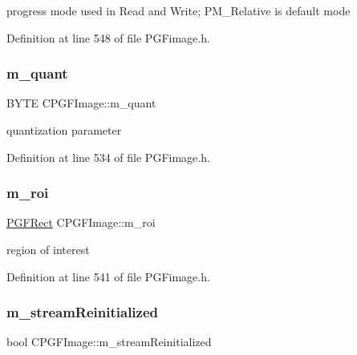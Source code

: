 progress mode used in Read and Write; P\+M\+\_\+\+Relative is default mode 



Definition at line 548 of file P\+G\+Fimage.\+h.

\mbox{\label{classCPGFImage_a57cc024db6e510f95f3238f448a0fed5}} 
\subsubsection{\texorpdfstring{m\_quant}{m\_quant}}
{\footnotesize\ttfamily B\+Y\+TE C\+P\+G\+F\+Image\+::m\+\_\+quant\hspace{0.3cm}{\ttfamily [protected]}}



quantization parameter 



Definition at line 534 of file P\+G\+Fimage.\+h.

\mbox{\label{classCPGFImage_a79627ae9b19c69589eaa2ba7711ddd00}} 
\subsubsection{\texorpdfstring{m\_roi}{m\_roi}}
{\footnotesize\ttfamily \mbox{\hyperlink{structPGFRect}{P\+G\+F\+Rect}} C\+P\+G\+F\+Image\+::m\+\_\+roi\hspace{0.3cm}{\ttfamily [protected]}}



region of interest 



Definition at line 541 of file P\+G\+Fimage.\+h.

\mbox{\label{classCPGFImage_af6d3fe5a8622634d1d0faf56cde335ef}} 
\subsubsection{\texorpdfstring{m\_streamReinitialized}{m\_streamReinitialized}}
{\footnotesize\ttfamily bool C\+P\+G\+F\+Image\+::m\+\_\+stream\+Reinitialized\hspace{0.3cm}{\ttfamily [protected]}}



